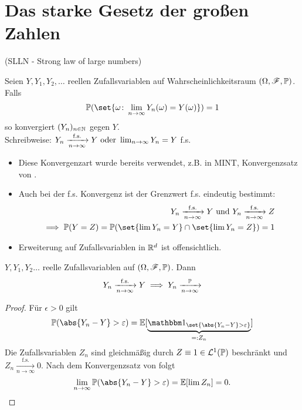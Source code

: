 \section{Das starke Gesetz der großen Zahlen}
(SLLN - Strong law of large numbers)\\
\begin{definition}
	Seien $Y,Y_1, Y_2, \dots$ reellen Zufallsvariablen auf Wahrscheinlichkeitsraum $(\O,\F,\P)$. Falls
	\begin{align*}
		\P(\set{\omega\colon \lim_{n\to \infty} Y_n(\omega) = Y(\omega)}) = 1
	\end{align*}
	so konvergiert $(Y_n)_{n\in \N}$  gegen $Y$.\\
	Schreibweise: $Y_n \xrightarrow[n \to \infty]{\text{f.s.}} Y \oder \lim_{n\to \infty} Y_n = Y$ f.s.
\end{definition}
\begin{*remark}
	\begin{itemize}
		\item Diese Konvergenzart wurde bereits verwendet, z.B. in MINT, Konvergenzsatz von .
		\item Auch bei der f.s. Konvergenz ist der Grenzwert f.s. eindeutig bestimmt:
		\begin{align*}
			Y_n \xrightarrow[n \to \infty]{\text{f.s.}}Y \und Y_n \xrightarrow[n \to \infty]{\text{f.s.}}Z\\
			\implies \P(Y=Z) = \P(\set{\lim Y_n = Y} \cap \set{\lim Y_n = Z}) = 1
		\end{align*}
		\item Erweiterung auf Zufallsvariablen in $\Rd$ ist offensichtlich.
	\end{itemize}
\end{*remark}
\begin{lemma}
	$Y,Y_1,Y_2 \dots$ reelle Zufallsvariablen auf $(\O,\F,\P)$. Dann
	\begin{align*}
		Y_n \xrightarrow[n \to \infty]{\text{f.s.}} Y \implies Y_n \xrightarrow[n \to \infty]{\P}
	\end{align*}
\end{lemma}
\begin{proof}
	Für $\epsilon > 0$ gilt
	\begin{align*}
		\P(\abs{Y_n - Y} > \epsilon) = \E[\underbrace{\indi_{\set{\abs{Y_n - Y}> \epsilon}}}_{=: Z_n}]
	\end{align*}
	Die Zufallsvariablen $Z_n$ sind gleichmäßig durch $Z \equiv 1 \in \Ln{1}(\P)$ beschränkt und $Z_n \xrightarrow[n \to \infty]{\text{f.s.}} 0$. Nach dem Konvergenzsatz von  folgt
	\begin{align*}
		\lim_{n\to \infty} \P(\abs{Y_n - Y}> \epsilon) = \E[\lim Z_n] = 0.
	\end{align*}
\end{proof}
